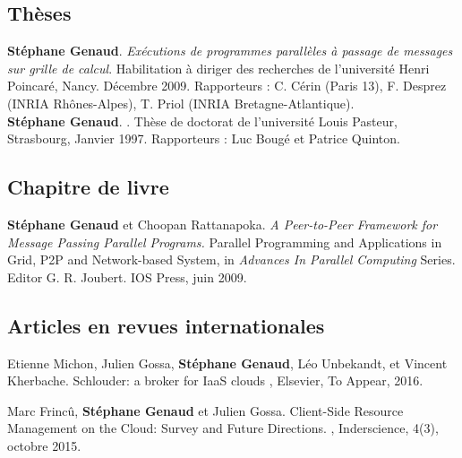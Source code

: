 \documentclass[11pt]{article}
\begin{document}
\small

\begin{thebibliography}{99}

\subsection*{Thèses}

\textbf{Stéphane Genaud}.
\newblock 
{\em Exécutions de programmes parallèles à passage de messages sur grille de 
calcul}.
\newblock 
Habilitation à diriger des recherches de l'université Henri Poincaré, 
Nancy. Décembre 2009.
\newblock 
Rapporteurs : C. Cérin (Paris 13), F. Desprez (INRIA Rhônes-Alpes), 
T. Priol (INRIA Bretagne-Atlantique).\\[2mm]

\textbf{Stéphane Genaud}.
.
\newblock Thèse de doctorat de l'université Louis Pasteur, Strasbourg, Janvier 1997.
\newblock Rapporteurs : Luc Bougé et Patrice Quinton. 

\subsection*{Chapitre de livre}

\textbf{Stéphane Genaud} et Choopan Rattanapoka.
\newblock 
\emph{A Peer-to-Peer Framework for Message Passing Parallel Programs.}
\newblock 
Parallel Programming and Applications in Grid, P2P and Network-based System,
in {\em Advances In Parallel Computing} Series. Editor G. R. Joubert.
IOS Press, juin 2009. 
 

\subsection*{Articles en revues internationales}

\setlength{\itemsep}{1.5mm}

\newblock Etienne Michon, Julien Gossa, \textbf{Stéphane Genaud}, Léo Unbekandt, et Vincent Kherbache.
\newblock Schlouder: a broker for IaaS clouds
, Elsevier, To Appear, 2016.


\newblock Marc Frincû, \textbf{Stéphane Genaud} et Julien Gossa.
\newblock Client-Side Resource Management on the Cloud: Survey and Future Directions.
, Inderscience, 4(3), octobre 2015.



\end{thebibliography}
\end{document}
